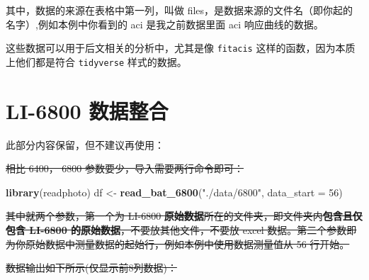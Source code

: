 \documentclass[
]{krantz}
\makeatletter
\newenvironment{Shaded}{\begin{snugshade}}{\end{snugshade}}
\newcommand{\DataTypeTok}[1]{\textcolor[rgb]{0.13,0.29,0.53}{#1}}
\newcommand{\DecValTok}[1]{\textcolor[rgb]{0.00,0.00,0.81}{#1}}
\newcommand{\KeywordTok}[1]{\textcolor[rgb]{0.13,0.29,0.53}{\textbf{#1}}}
\newcommand{\NormalTok}[1]{#1}
\newcommand{\StringTok}[1]{\textcolor[rgb]{0.31,0.60,0.02}{#1}}
\newenvironment{kframe}{%
\medskip{}
\setlength{\fboxsep}{.8em}
 \def\at@end@of@kframe{}%
 \ifinner\ifhmode%
  \def\at@end@of@kframe{\end{minipage}}%
  \begin{minipage}{\columnwidth}%
 \fi\fi%
 \def\FrameCommand##1{\hskip\@totalleftmargin \hskip-\fboxsep
 \colorbox{shadecolor}{##1}\hskip-\fboxsep
     \hskip-\linewidth \hskip-\@totalleftmargin \hskip\columnwidth}%
 \MakeFramed {\advance\hsize-\width
   \@totalleftmargin\z@ \linewidth\hsize
   \@setminipage}}%
 {\par\unskip\endMakeFramed%
 \at@end@of@kframe}
\renewenvironment{Shaded}{\begin{kframe}}{\end{kframe}}
\makeatother
\begin{document}
其中，数据的来源在表格中第一列，叫做 files，是数据来源的文件名（即你起的名字）,例如本例中你看到的 aci 是我之前数据里面 aci 响应曲线的数据。

这些数据可以用于后文相关的分析中，尤其是像 \texttt{fitacis} 这样的函数，因为本质上他们都是符合 \texttt{tidyverse} 样式的数据。

\hypertarget{batch68}{%
\section{LI-6800 数据整合}\label{batch68}}

此部分内容保留，但不建议再使用：

\sout{相比 6400， 6800 参数要少，导入需要两行命令即可：}

\begin{Shaded}
\begin{Highlighting}[]
\KeywordTok{library}\NormalTok{(readphoto)}
\NormalTok{df \textless{}{-}}\StringTok{ }\KeywordTok{read\_bat\_6800}\NormalTok{(}\StringTok{"./data/6800"}\NormalTok{, }\DataTypeTok{data\_start =} \DecValTok{56}\NormalTok{)}
\end{Highlighting}
\end{Shaded}

\sout{其中就两个参数，第一个为 LI-6800 \textbf{原始数据}所在的文件夹，即文件夹内\textbf{包含且仅包含 LI-6800 的原始数据}，不要放其他文件，不要放 excel 数据。第二个参数即为你原始数据中测量数据的起始行，例如本例中使用数据测量值从 56 行开始。}

\sout{数据输出如下所示(仅显示前8列数据)：}
\end{document}
